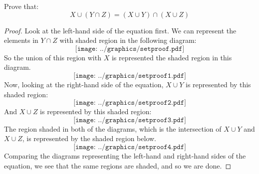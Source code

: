 \begin{question} Prove that:
\[
X\cup (Y \cap Z) = (X \cup Y)\cap (X \cup Z)
\]
\end{question}

\begin{proof} 
Look at the left-hand side of the equation first. We can represent the
elements in $Y\cap Z$ with shaded region in the following diagram:
\[
\texttt{[image: ../graphics/setproof.pdf]}
\]
So the union of this region with $X$ is represented the shaded
region in this diagram.
\[
\texttt{[image: ../graphics/setproof1.pdf]}
\]
Now, looking at the right-hand side of the equation, $X\cup Y$ is
represented by this shaded region:
\[
\texttt{[image: ../graphics/setproof2.pdf]}
\]
And $X\cup Z$ is represented by this shaded region:
\[
\texttt{[image: ../graphics/setproof3.pdf]}
\]
The region shaded in both of the diagrams, which is the
intersection of $X\cup Y$ and $X\cup Z$, is represented by the shaded
region below.
\[
\texttt{[image: ../graphics/setproof4.pdf]}
\]
Comparing the diagrams representing the left-hand and right-hand sides
of the equation, we see that the same regions are shaded, and so we
are done.
\end{proof}


